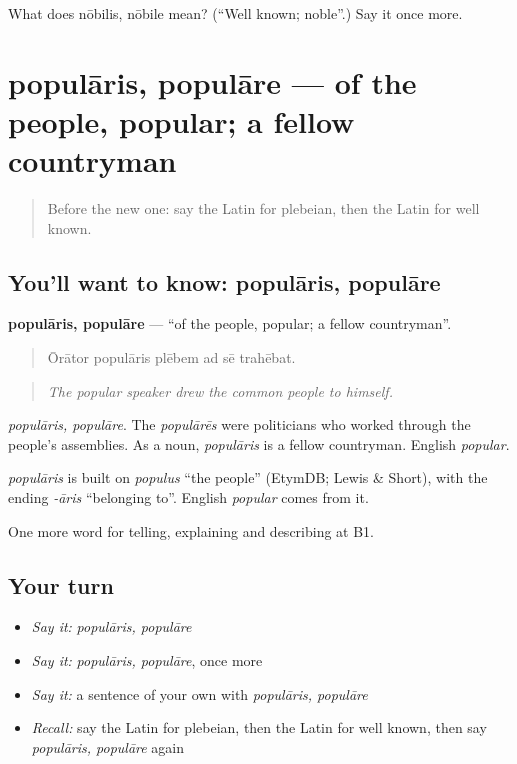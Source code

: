\begin{tcolorbox}[breakable,colback=teal!4,colframe=teal!35!black,title={Before you move on}]
What does nōbilis, nōbile mean? (\textquotedblleft{}Well known; noble\textquotedblright{}.) Say it once more.
\end{tcolorbox}
\section[populāris, populāre]{populāris, populāre — of the people, popular; a fellow countryman}

\label{lesson:LA-C382-popularis}



\begin{quote}
Before the new one: say the Latin for plebeian, then the Latin for well known.
\end{quote}

\subsection*{You'll want to know: populāris, populāre}
\textbf{populāris, populāre} — \textquotedblleft{}of the people, popular; a fellow countryman\textquotedblright{}.

\begin{quote}
Ōrātor populāris plēbem ad sē trahēbat.
\end{quote}

\begin{quote}
\emph{The popular speaker drew the common people to himself.}
\end{quote}

\emph{populāris, populāre}. The \emph{populārēs} were politicians who worked through the people's assemblies. As a noun, \emph{populāris} is a fellow countryman. English \emph{popular}.

\begin{cousinweb}
\emph{populāris} is built on \emph{populus} \textquotedblleft{}the people\textquotedblright{} (EtymDB; Lewis \& Short), with the ending \emph{-āris} \textquotedblleft{}belonging to\textquotedblright{}. English \emph{popular} comes from it.
\end{cousinweb}

\begin{grammarlens}[title={What you've built}]
One more word for telling, explaining and describing at B1.
\end{grammarlens}

\subsection*{Your turn}
\begin{itemize}
\raggedright
  \item \emph{Say it:} \emph{populāris, populāre}
  \item \emph{Say it:} \emph{populāris, populāre}, once more
  \item \emph{Say it:} a sentence of your own with \emph{populāris, populāre}
  \item \emph{Recall:} say the Latin for plebeian, then the Latin for well known, then say \emph{populāris, populāre} again
\end{itemize}

